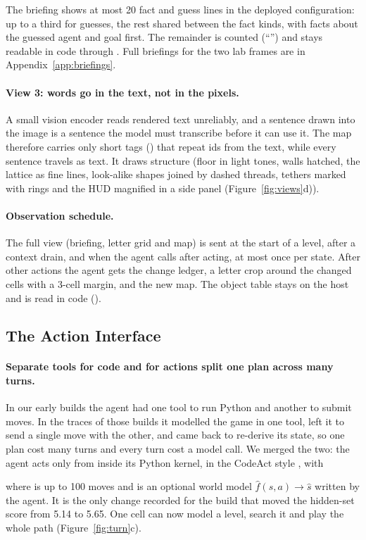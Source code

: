 The briefing shows at most 20 fact and guess lines in the deployed configuration: up to a third for guesses, the rest shared between the fact kinds, with facts about the guessed agent and goal first. The remainder is counted (``'') and stays readable in code through . Full briefings for the two lab frames are in Appendix~\ref{app:briefings}.

\paragraph{View 3: words go in the text, not in the pixels.}
A small vision encoder reads rendered text unreliably, and a sentence drawn into the image is a sentence the model must transcribe before it can use it. The map therefore carries only short tags () that repeat ids from the text, while every sentence travels as text. It draws structure (floor in light tones, walls hatched, the lattice as fine lines, look-alike shapes joined by dashed threads, tethers marked with rings and the HUD magnified in a side panel (Figure~\ref{fig:views}d)).

\paragraph{Observation schedule.}
The full view (briefing, letter grid and map) is sent at the start of a level, after a context drain, and when the agent calls  after acting, at most once per state. After other actions the agent gets the change ledger, a letter crop around the changed cells with a 3-cell margin, and the new map. The object table stays on the host and is read in code ().

\subsection{The Action Interface}
\label{sec:interface}

\paragraph{Separate tools for code and for actions split one plan across many turns.}
In our early builds the agent had one tool to run Python and another to submit moves. In the traces of those builds it modelled the game in one tool, left it to send a single move with the other, and came back to re-derive its state, so one plan cost many turns and every turn cost a model call. We merged the two: the agent acts only from inside its Python kernel, in the CodeAct style \citep{wang2024codeact}, with
\begin{center}
{\small{}}
\end{center}
where  is up to 100 moves and  is an optional world model $\hat{f}(s, a) \to \hat{s}$ written by the agent. It is the only change recorded for the build that moved the hidden-set score from 5.14 to 5.65. One cell can now model a level, search it and play the whole path (Figure~\ref{fig:turn}c).

